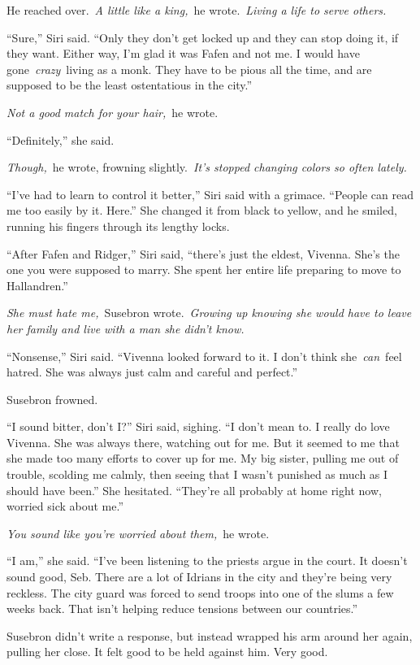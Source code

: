 He reached over.~\textit{A little like a king,}~he wrote.~\textit{Living a life to serve others.}

“Sure,” Siri said. “Only they don’t get locked up and they can stop doing it, if they want. Either way, I’m glad it was Fafen and not me. I would have gone~\textit{crazy}~living as a monk. They have to be pious all the time, and are supposed to be the least ostentatious in the city.”

\textit{Not a good match for your hair,}~he wrote.

“Definitely,” she said.

\textit{Though,}~he wrote, frowning slightly.~\textit{It’s stopped changing colors so often lately.}

“I’ve had to learn to control it better,” Siri said with a grimace. “People can read me too easily by it. Here.” She changed it from black to yellow, and he smiled, running his fingers through its lengthy locks.

“After Fafen and Ridger,” Siri said, “there’s just the eldest, Vivenna. She’s the one you were supposed to marry. She spent her entire life preparing to move to Hallandren.”

\textit{She must hate me,}~Susebron wrote.~\textit{Growing up knowing she would have to leave her family and live with a man she didn’t know.}

“Nonsense,” Siri said. “Vivenna looked forward to it. I don’t think she~\textit{can}~feel hatred. She was always just calm and careful and perfect.”

Susebron frowned.

“I sound bitter, don’t I?” Siri said, sighing. “I don’t mean to. I really do love Vivenna. She was always there, watching out for me. But it seemed to me that she made too many efforts to cover up for me. My big sister, pulling me out of trouble, scolding me calmly, then seeing that I wasn’t punished as much as I should have been.” She hesitated. “They’re all probably at home right now, worried sick about me.”

\textit{You sound like you’re worried about them,}~he wrote.

“I am,” she said. “I’ve been listening to the priests argue in the court. It doesn’t sound good, Seb. There are a lot of Idrians in the city and they’re being very reckless. The city guard was forced to send troops into one of the slums a few weeks back. That isn’t helping reduce tensions between our countries.”

Susebron didn’t write a response, but instead wrapped his arm around her again, pulling her close. It felt good to be held against him. Very good.

